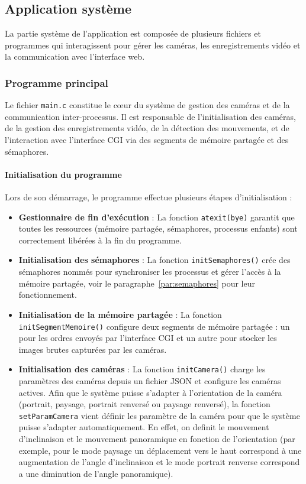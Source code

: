 \documentclass[a4paper, 11pt, french]{article}
\begin{document}
\subsection{Application système}

La partie système de l'application est composée de plusieurs fichiers et programmes qui interagissent pour gérer les caméras, les enregistrements vidéo et la communication avec l'interface web. 

\subsubsection{Programme principal}

Le fichier \texttt{main.c} constitue le cœur du système de gestion des caméras et de la communication inter-processus. Il est responsable de l'initialisation des caméras, de la gestion des enregistrements vidéo, de la détection des mouvements, et de l'interaction avec l'interface CGI via des segments de mémoire partagée et des sémaphores.

\paragraph{Initialisation du programme}
Lors de son démarrage, le programme effectue plusieurs étapes d'initialisation :
\begin{itemize}
    \item \textbf{Gestionnaire de fin d'exécution} : La fonction \texttt{atexit(bye)} garantit que toutes les ressources (mémoire partagée, sémaphores, processus enfants) sont correctement libérées à la fin du programme.
    \item \textbf{Initialisation des sémaphores} : La fonction \texttt{initSemaphores()} crée des sémaphores nommés pour synchroniser les processus et gérer l'accès à la mémoire partagée, voir le paragraphe~\ref{par:semaphores} pour leur fonctionnement.
    \item \textbf{Initialisation de la mémoire partagée} : La fonction \texttt{initSegmentMemoire()} configure deux segments de mémoire partagée : un pour les ordres envoyés par l'interface CGI et un autre pour stocker les images brutes capturées par les caméras.
    \item \textbf{Initialisation des caméras} : La fonction \texttt{initCamera()} charge les paramètres des caméras depuis un fichier JSON et configure les caméras actives. Afin que le système puisse s'adapter à l'orientation de la caméra (portrait, paysage, portrait renversé ou paysage renversé), la fonction \texttt{setParamCamera} vient définir les paramètre de la caméra pour que le système puisse s'adapter automatiquement. En effet, on definit le mouvement d'inclinaison et le mouvement panoramique en fonction de l'orientation (par exemple, pour le mode paysage un déplacement vers le haut correspond à une augmentation de l'angle d'inclinaison et le mode portrait renverse correspond a une diminution de l'angle panoramique).
\end{itemize}
\end{document}
